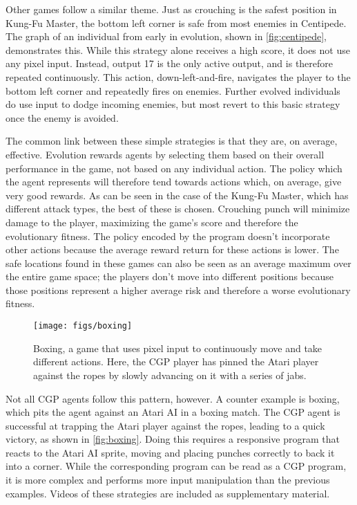 \documentclass[sigconf,screen]{acmart}\settopmatter{printfolios=true,printacmref=false}
\begin{document}
Other games follow a similar theme. Just as crouching is the safest position in
Kung-Fu Master, the bottom left corner is safe from most enemies in Centipede.
The graph of an individual from early in evolution, shown in
\autoref{fig:centipede}, demonstrates this. While this strategy alone receives a
high score, it does not use any pixel input. Instead, output 17 is the only
active output, and is therefore repeated continuously. This action,
down-left-and-fire, navigates the player to the bottom left corner and
repeatedly fires on enemies. Further evolved individuals do use input to dodge
incoming enemies, but most revert to this basic strategy once the enemy is
avoided.

The common link between these simple strategies is that they are, on average,
effective. Evolution rewards agents by selecting them based on their overall
performance in the game, not based on any individual action. The policy which
the agent represents will therefore tend towards actions which, on average, give
very good rewards. As can be seen in the case of the Kung-Fu Master, which has
different attack types, the best of these is chosen. Crouching punch will
minimize damage to the player, maximizing the game's score and therefore the
evolutionary fitness. The policy encoded by the program doesn't incorporate
other actions because the average reward return for these actions is lower. The
safe locations found in these games can also be seen as an average maximum over
the entire game space; the players don't move into different positions because
those positions represent a higher average risk and therefore a worse
evolutionary fitness.

\begin{figure}[h]
  \texttt{[image: figs/boxing]}
  \caption{Boxing, a game that uses pixel input to continuously move and take
    different actions. Here, the CGP player has pinned the Atari player against
    the ropes by slowly advancing on it with a series of jabs.}
  \label{fig:boxing}
\end{figure}



Not all CGP agents follow this pattern, however. A counter example is boxing,
which pits the agent against an Atari AI in a boxing match. The CGP agent is
successful at trapping the Atari player against the ropes, leading to a quick
victory, as shown in \autoref{fig:boxing}. Doing this requires a responsive
program that reacts to the Atari AI sprite, moving and placing punches correctly
to back it into a corner. While the corresponding program can be read as a CGP
program, it is more complex and performs more input manipulation than the
previous examples. Videos of these strategies are included as supplementary
material.
\end{document}
